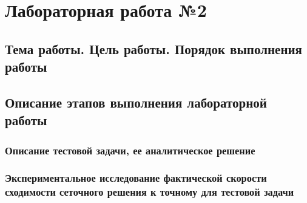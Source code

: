 \documentclass[a4paper,14pt,russian, leqno, fleqn]{extreport}
\begin{document}
	\chapter{Лабораторная работа №2}
	\section{Тема работы. Цель работы. Порядок выполнения работы}
	\section{Описание этапов выполнения лабораторной работы}
	\subsection{Описание тестовой задачи, ее аналитическое решение}
	\subsection{Экспериментальное исследование фактической скорости сходимости сеточного решения к точному для тестовой задачи}
\end{document}
